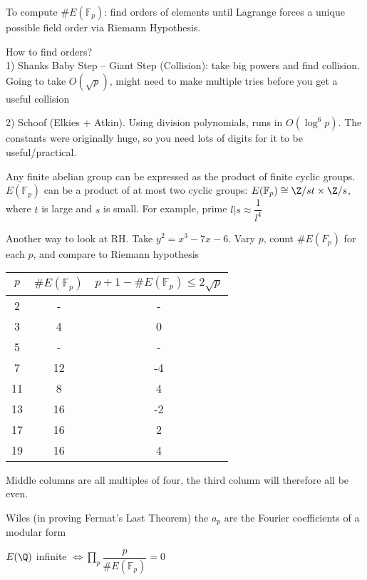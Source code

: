 \documentclass[twoside, 10pt]{article}
\newcommand{\F}{\mathbb{F}}
\begin{document}
To compute $\#E(\F_p)$: find orders of elements until Lagrange forces a unique possible field order via Riemann Hypothesis.

How to find orders?\\
1) Shanks Baby Step -- Giant Step (Collision): take big powers and find collision. Going to take $O(\sqrt{p})$, might need to make multiple tries before you get a useful collision

2) Schoof (Elkies + Atkin). Using division polynomials, runs in $O(\log^6 p)$. The constants were originally huge, so you need lots of digits for it to be useful/practical.

\begin{rmk}
    Any finite abelian group can be expressed as the product of finite cyclic groups. $E(\F_p)$ can be a product of at most two cyclic groups: $E(\F_p) \cong \Z/st \times \Z/s$, where $t$ is large and $s$ is small. For example, prime $l | s \approx \dfrac{1}{l^4}$
\end{rmk}

\begin{exm*}
    Another way to look at RH. Take $y^2 = x^3 - 7x - 6$. Vary $p$, count $\#E(F_p)$ for each $p$, and compare to Riemann hypothesis
\end{exm*}

\begin{tabular}{c|c|c}
    $p$ & $\#E(\F_p)$ & $p + 1 - \#E(\F_p) \leq 2\sqrt{p}$\\
    \hline
    2 & - & -\\
    3 & 4 & 0\\
    5 & - & -\\
    7 & 12 & -4\\
    11 & 8 & 4\\
    13 & 16 & -2\\
    17 & 16 & 2\\
    19 & 16 & 4\\
\end{tabular}

Middle columns are all multiples of four, the third column will therefore all be even.

\begin{rmk}
    Wiles (in proving Fermat's Last Theorem) the $a_p$ are the Fourier coefficients of a modular form %
\end{rmk}
\begin{rmk}
    $E(\Q)$ infinite $\iff \prod\limits_p \dfrac{p}{\#E(\F_p)} = 0$
\end{rmk}
\end{document}
